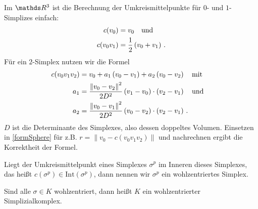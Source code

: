     \begin{bemerkung}
      Im \( \R^{3} \) ist die Berechnung der Umkreismittelpunkte für \( 0 \)- und \( 1 \)-Simplizes einfach:
      \begin{align}
        c(v_{0}) &= v_{0} \quad\text{und}\quad\\
        c(v_{0}v_{1}) &= \frac{1}{2} \left(v_{0} + v_{1} \right) \,\text{.}
      \end{align}
      Für ein \( 2 \)-Simplex nutzen wir die Formel
      \begin{align}
        \begin{aligned}
          c(v_{0}v_{1}v_{2}) &= v_{0} + a_{1}\left( v_{0} - v_{1} \right) + a_{2} \left( v_{0} - v_{2} \right) \quad\text{mit}\quad \\
          a_{1} &= \frac{\left\| v_{0} - v_{2} \right\|^{2}}{2 D^{2}} \left(v_{1} - v_{0} \right) \cdot \left(v_{2} - v_{1} \right) \quad\text{und}\quad \\ 
          a_{2} &= \frac{\left\| v_{0} - v_{1} \right\|^{2}}{2 D^{2}} \left(v_{0} - v_{2} \right) \cdot \left(v_{2} - v_{1} \right) \,\text{.}
        \end{aligned}
      \end{align}
      \( D \) ist die Determinante des Simplexes, also dessen doppeltes Volumen. 
      Einsetzen in \eqref{formSphere} für z.B. \( r = \left\| v_{0} - c(v_{0}v_{1}v_{2}) \right\| \) und nachrechnen ergibt die Korrektheit der Formel.
    \end{bemerkung}

    \begin{definition}
      Liegt der Umkreismittelpunkt eines Simplexes \( \sigma^{p} \) im Inneren dieses Simplexes, das heißt \( c(\sigma^{p}) \in \text{Int}(\sigma^{p}) \),
      dann nennen wir \( \sigma^{p} \) ein wohlzentriertes Simplex.

      Sind alle \( \sigma \in K \) wohlzentriert, dann heißt \( K \) ein wohlzentrierter Simplizialkomplex.
    \end{definition}

